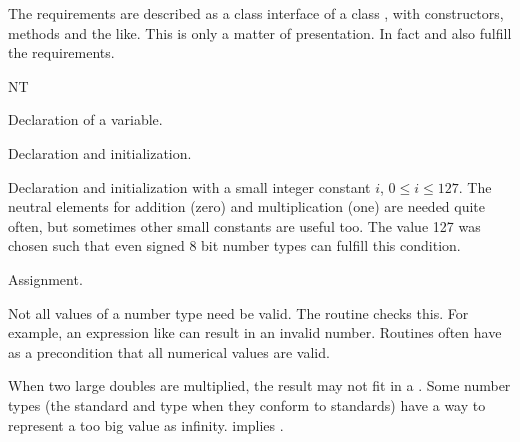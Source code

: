 The requirements are described as a class interface of a class , 
with constructors, methods and the like. 
This is only a matter of presentation.  
In fact  and  also fulfill the requirements.

\begin{ccClass} {NT}
\ccSetTwoColumns{}{\hspace*{8.5cm}}
\ccCreation
{}

	    {Declaration of a variable.}


	    {Declaration and initialization.}


	    {Declaration and initialization with a small integer
constant $i$, $0 \leq i \leq 127$. The neutral elements for addition
(zero) and multiplication (one) are needed quite often, but sometimes
other small constants are useful too. The value 127 was chosen such
that even signed 8 bit number types can fulfill this condition.  }

\ccOperations
{}
        {Assignment. 
}


{Not all values of a number type need be valid. The routine
 checks this. For example, an expression like
 can result in an invalid number. Routines often
have as a precondition that all numerical values are valid.}

{ When two large doubles are multiplied, the result may not fit in a
  . 
  Some number types (the standard  and  type
  when they conform to standards) have a way to represent a too big
  value as infinity.   implies
  .}

       {}
\ccGlue
{}
       {}
\ccGlue
{}
       {}
\ccGlue
{}
       {}
\ccGlue
{}
       {}
\ccGlue
{}
       {}
\ccGlue
{}
       {}
\ccGlue
{}
       {}
\ccGlue
{}
       {}
\ccGlue
{}
       {}
\ccGlue
{}
       {}
\ccGlue
{}
       {}
\ccGlue
{}
       {}


\end{ccClass}

